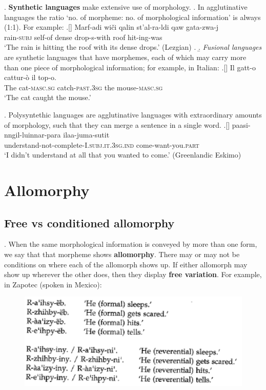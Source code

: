 \documentclass[11pt, oneside]{article}   	%
\begin{document}
\ex. {\bfseries Synthetic languages} make extensive use of morphology. 
\a. In agglutinative languages the ratio `no. of morpheme: no. of morphological information' is always (1:1). For example:
	\ag.[] Marf-adi wi{\v c}i qalin st'al-ra-ldi qaw gata-zwa-j \\
	rain-{\scshape subj} self-of dense drop-s-with roof hit-ing-was \\
	`The rain is hitting the roof with its dense drops.' \hfill (Lezgian)                        
	\z.
\b. {\itshape Fusional languages} are synthetic languages that have morphemes, each of which may carry more than one piece of morphological information; for example, in Italian:
	\ag.[] Il gatt-o cattur-ò il top-o. \\
	\small The cat-{\scshape masc.sg} catch-{\scshape past.3sg} the mouse-{\scshape masc.sg} \\
	`The cat caught the mouse.'

\ex. Polysyntethic languages are agglutinative languages with extraordinary amounts of morphology, such that they can merge a sentence in a single word. 
\ag.[] paasi-nngil-luinnar-para 	ilaa-juma-sutit \\
understand-not-complete-{\scshape I.subj.it.3sg.ind}   come-want-you.{\scshape part} \\
`I didn't understand at all that you wanted to come.' \hfill (Greenlandic Eskimo)

\section{Allomorphy}\label{allormophy}

\subsection{Free vs conditioned allomorphy}

\ex. When the same morphological information is conveyed by more than one form, we say that that morpheme shows {\bfseries allomorphy}. There may or may not be conditions on where each of the allomorph shows up.  If either allomorph may show up wherever the other does, then they display {\bfseries free variation}. For example, in Zapotec (spoken in Mexico):

\begin{figure}[H]
\centering
\includegraphics{zapotec.png}
\end{figure}%
\end{document}
